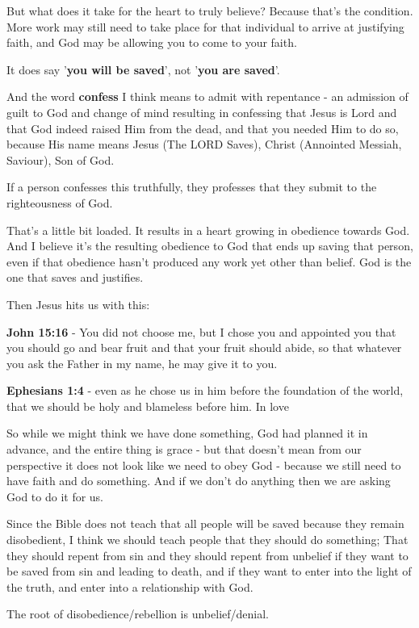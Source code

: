 \documentclass[11pt]{article}
\begin{document}
But what does it take for the heart to truly believe? Because that's the condition.
More work may still need to take place for that individual to arrive at justifying faith, and God may be allowing you to come to your faith.

It does say '\textbf{you will be saved}', not '\textbf{you are saved}'.

And the word \textbf{confess} I think means to admit with repentance - an admission of guilt to God and change of mind resulting in confessing that Jesus is Lord and that God indeed raised Him from the dead, and that you needed Him to do so, because His name means Jesus (The LORD Saves), Christ (Annointed Messiah, Saviour), Son of God.

If a person confesses this truthfully, they professes that they submit to the righteousness of God.

That's a little bit loaded. It results in a heart growing in obedience towards God.
And I believe it's the resulting obedience to God that ends up saving that person, even if that obedience hasn't produced any work yet other than belief. God is the one that saves and justifies.

Then Jesus hits us with this:

\textbf{John 15:16} - You did not choose me, but I chose you and appointed you that you should go and bear fruit and that your fruit should abide, so that whatever you ask the Father in my name, he may give it to you.

\textbf{Ephesians 1:4} - even as he chose us in him before the foundation of the world, that we should be holy and blameless before him. In love

So while we might think we have done something, God had planned it in advance, and the entire thing is grace - but that doesn't mean from our perspective it does not look like we need to obey God - because we still need to have faith and do something. And if we don't do anything then we are asking God to do it for us.

Since the Bible does not teach that all people will be saved because they remain disobedient, I think we should teach people that they should do something; That they should repent from sin and they should repent from unbelief if they want to be saved from sin and leading to death, and if they want to enter into the light of the truth, and enter into a relationship with God.

The root of disobedience/rebellion is unbelief/denial.
\end{document}
